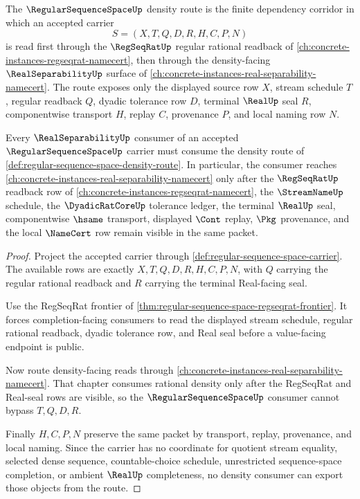 \begin{definition}
\label{def:regular-sequence-space-density-route}
The $\RegularSequenceSpaceUp$ density route is the finite dependency corridor in which an accepted carrier
$$
S=(X,T,Q,D,R,H,C,P,N)
$$
is read first through the $\RegSeqRatUp$ regular rational readback of \autoref{ch:concrete-instances-regseqrat-namecert}, then through the density-facing $\RealSeparabilityUp$ surface of \autoref{ch:concrete-instances-real-separability-namecert}. The route exposes only the displayed source row $X$, stream schedule $T$, regular readback $Q$, dyadic tolerance row $D$, terminal $\RealUp$ seal $R$, componentwise transport $H$, replay $C$, provenance $P$, and local naming row $N$.
\end{definition}

\begin{theorem}
\label{thm:regular-sequence-space-regseqrat-density-consumption}
Every $\RealSeparabilityUp$ consumer of an accepted $\RegularSequenceSpaceUp$ carrier must consume the density route of \autoref{def:regular-sequence-space-density-route}. In particular, the consumer reaches \autoref{ch:concrete-instances-real-separability-namecert} only after the $\RegSeqRatUp$ readback row of \autoref{ch:concrete-instances-regseqrat-namecert}, the $\StreamNameUp$ schedule, the $\DyadicRatCoreUp$ tolerance ledger, the terminal $\RealUp$ seal, componentwise $\hsame$ transport, displayed $\Cont$ replay, $\Pkg$ provenance, and the local $\NameCert$ row remain visible in the same packet.
\end{theorem}
\begin{proof}
Project the accepted carrier through \autoref{def:regular-sequence-space-carrier}. The available rows are exactly $X,T,Q,D,R,H,C,P,N$, with $Q$ carrying the regular rational readback and $R$ carrying the terminal Real-facing seal.

Use the RegSeqRat frontier of \autoref{thm:regular-sequence-space-regseqrat-frontier}. It forces completion-facing consumers to read the displayed stream schedule, regular rational readback, dyadic tolerance row, and Real seal before a value-facing endpoint is public.

Now route density-facing reads through \autoref{ch:concrete-instances-real-separability-namecert}. That chapter consumes rational density only after the RegSeqRat and Real-seal rows are visible, so the $\RegularSequenceSpaceUp$ consumer cannot bypass $T,Q,D,R$.

Finally $H,C,P,N$ preserve the same packet by transport, replay, provenance, and local naming. Since the carrier has no coordinate for quotient stream equality, selected dense sequence, countable-choice schedule, unrestricted sequence-space completion, or ambient $\RealUp$ completeness, no density consumer can export those objects from the route.
\end{proof}
